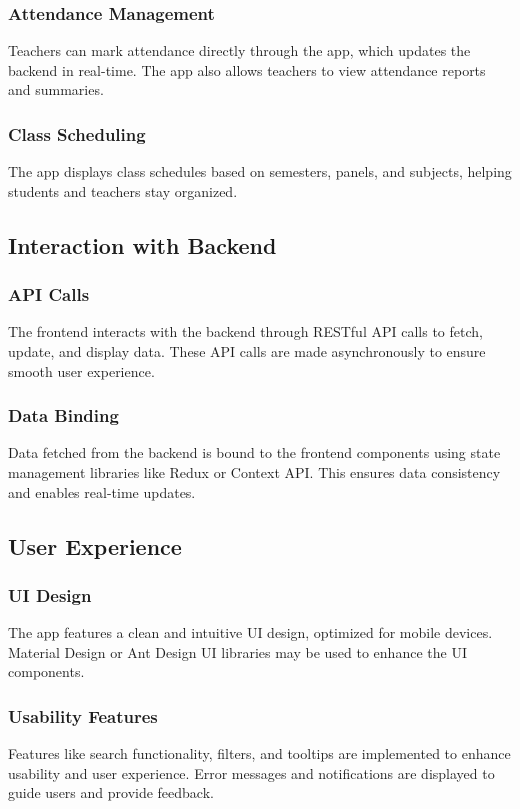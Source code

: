 \documentclass[conference]{IEEEtran}
\begin{document}
\subsubsection{Attendance Management}
Teachers can mark attendance directly through the app, which updates the backend in real-time. The app also allows teachers to view attendance reports and summaries.

\subsubsection{Class Scheduling}
The app displays class schedules based on semesters, panels, and subjects, helping students and teachers stay organized.

\subsection{Interaction with Backend}
\subsubsection{API Calls}
The frontend interacts with the backend through RESTful API calls to fetch, update, and display data. These API calls are made asynchronously to ensure smooth user experience.

\subsubsection{Data Binding}
Data fetched from the backend is bound to the frontend components using state management libraries like Redux or Context API. This ensures data consistency and enables real-time updates.

\subsection{User Experience}
\subsubsection{UI Design}
The app features a clean and intuitive UI design, optimized for mobile devices. Material Design or Ant Design UI libraries may be used to enhance the UI components.

\subsubsection{Usability Features}
Features like search functionality, filters, and tooltips are implemented to enhance usability and user experience. Error messages and notifications are displayed to guide users and provide feedback.
\end{document}
